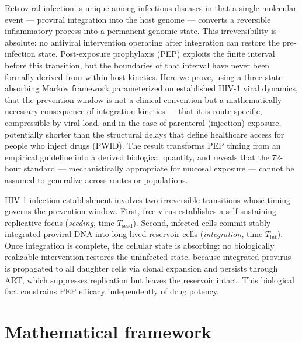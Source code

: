 \documentclass[10pt,letterpaper]{article}
\theoremstyle{definition}
\theoremstyle{remark}
\newcommand{\Tseed}{T_{\text{seed}}}
\newcommand{\Tint}{T_{\text{int}}}
\begin{document}
Retroviral infection is unique among infectious diseases in that a single molecular event --- proviral integration into the host genome --- converts a reversible inflammatory process into a permanent genomic state. This irreversibility is absolute: no antiviral intervention operating after integration can restore the pre-infection state. Post-exposure prophylaxis (PEP) exploits the finite interval before this transition, but the boundaries of that interval have never been formally derived from within-host kinetics. Here we prove, using a three-state absorbing Markov framework parameterized on established HIV-1 viral dynamics\cite{tanner2025,chun1995,siliciano2005}, that the prevention window is not a clinical convention but a mathematically necessary consequence of integration kinetics --- that it is route-specific, compressible by viral load, and in the case of parenteral (injection) exposure, potentially shorter than the structural delays that define healthcare access for people who inject drugs (PWID). The result transforms PEP timing from an empirical guideline into a derived biological quantity, and reveals that the 72-hour standard --- mechanistically appropriate for mucosal exposure --- cannot be assumed to generalize across routes or populations.

HIV-1 infection establishment involves two irreversible transitions whose timing governs the prevention window. First, free virus establishes a self-sustaining replicative focus (\emph{seeding}, time $\Tseed$). Second, infected cells commit stably integrated proviral DNA into long-lived reservoir cells (\emph{integration}, time $\Tint$). Once integration is complete, the cellular state is absorbing: no biologically realizable intervention restores the uninfected state, because integrated provirus is propagated to all daughter cells via clonal expansion\cite{chun1995,siliciano2005} and persists through ART, which suppresses replication but leaves the reservoir intact\cite{perelson1997}. This biological fact constrains PEP efficacy independently of drug potency.


\section*{Mathematical framework}
\end{document}
